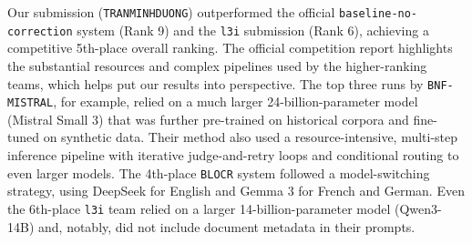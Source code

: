 \documentclass[11pt]{extarticle}
\begin{document}
\begin{table}[H]
    \centering
    \renewcommand{\arraystretch}{1.3}
    \caption{Leaderboard for the ICDAR 2026 HIPE-OCRepair competition. Our submission \texttt{TRANMINHDUONG} is highlighted, successfully outperforming the official no-correction baseline and that of \texttt{l3i}.}
    \label{tab:leaderboard}
\end{table}

Our submission (\texttt{TRANMINHDUONG}) outperformed the official \texttt{baseline-no-correction} system (Rank 9) and the \texttt{l3i} submission (Rank 6), achieving a competitive 5th-place overall ranking. The official competition report highlights the substantial resources and complex pipelines used by the higher-ranking teams, which helps put our results into perspective. The top three runs by \texttt{BNF-MISTRAL}, for example, relied on a much larger 24-billion-parameter model (Mistral Small 3) that was further pre-trained on historical corpora and fine-tuned on synthetic data. Their method also used a resource-intensive, multi-step inference pipeline with iterative judge-and-retry loops and conditional routing to even larger models. The 4th-place \texttt{BLOCR} system followed a model-switching strategy, using DeepSeek for English and Gemma 3 for French and German. Even the 6th-place \texttt{l3i} team relied on a larger 14-billion-parameter model (Qwen3-14B) and, notably, did not include document metadata in their prompts.
\end{document}
